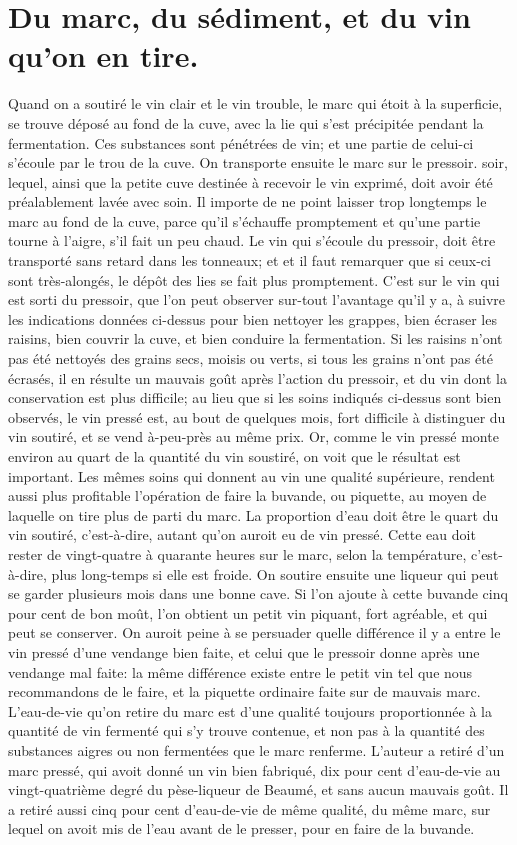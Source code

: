 \section{Du marc, du sédiment, et du vin qu'on en tire.}
Quand on a soutiré le vin clair et le vin trouble, le marc qui étoit à la superficie, se trouve déposé au fond de la cuve, avec la lie qui s'est précipitée pendant la fermentation. Ces substances sont pénétrées de vin; et une partie de celui-ci s'écoule par le trou de la cuve.
On transporte ensuite le marc sur le pressoir.\setcounter{page}{158} soir, lequel, ainsi que la petite cuve destinée à recevoir le vin exprimé, doit avoir été préalablement lavée avec soin.
Il importe de ne point laisser trop longtemps le marc au fond de la cuve, parce qu'il s'échauffe promptement et qu'une partie tourne à l'aigre, s'il fait un peu chaud.
Le vin qui s'écoule du pressoir, doit être transporté sans retard dans les tonneaux; et et il faut remarquer que si ceux-ci sont très-alongés, le dépôt des lies se fait plus promptement.
C'est sur le vin qui est sorti du pressoir, que l'on peut observer sur-tout l'avantage qu'il y a, à suivre les indications données ci-dessus pour bien nettoyer les grappes, bien écraser les raisins, bien couvrir la cuve, et bien conduire la fermentation.
Si les raisins n'ont pas été nettoyés des grains secs, moisis ou verts, si tous les grains n'ont pas été écrasés, il en résulte un mauvais goût après l'action du pressoir, et du vin dont la conservation est plus difficile; au lieu que si les soins indiqués ci-dessus sont bien observés, le vin pressé est, au bout de quelques mois, fort difficile à distinguer du vin soutiré, et se vend à-peu-près au même prix. Or, comme le vin pressé monte\setcounter{page}{159} environ au quart de la quantité du vin soustiré, on voit que le résultat est important. Les mêmes soins qui donnent au vin une qualité supérieure, rendent aussi plus profitable l'opération de faire la buvande, ou piquette, au moyen de laquelle on tire plus de parti du marc. La proportion d'eau doit être le quart du vin soutiré, c'est-à-dire, autant qu'on auroit eu de vin pressé. Cette eau doit rester de vingt-quatre à quarante heures sur le marc, selon la température, c'est-à-dire, plus long-temps si elle est froide. On soutire ensuite une liqueur qui peut se garder plusieurs mois dans une bonne cave. Si l'on ajoute à cette buvande cinq pour cent de bon moût, l'on obtient un petit vin piquant, fort agréable, et qui peut se conserver. On auroit peine à se persuader quelle différence il y a entre le vin pressé d'une vendange bien faite, et celui que le pressoir donne après une vendange mal faite: la même différence existe entre le petit vin tel que nous recommandons de le faire, et la piquette ordinaire faite sur de mauvais marc. L'eau-de-vie qu'on retire du marc est d'une qualité toujours proportionnée à la quantité de vin fermenté qui s'y trouve contenue, et\setcounter{page}{160} non pas à la quantité des substances aigres ou non fermentées que le marc renferme. L'auteur a retiré d'un marc pressé, qui avoit donné un vin bien fabriqué, dix pour cent d'eau-de-vie au vingt-quatrième degré du pèse-liqueur de Beaumé, et sans aucun mauvais goût. Il a retiré aussi cinq pour cent d'eau-de-vie de même qualité, du même marc, sur lequel on avoit mis de l'eau avant de le presser, pour en faire de la buvande.